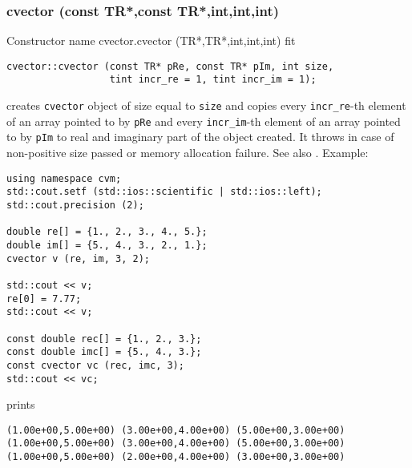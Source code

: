 \subsubsection{cvector (const TR*,const TR*,int,int,int)}
Constructor%
\pdfdest name {cvector.cvector (TR*,TR*,int,int,int)} fit
\begin{verbatim}
cvector::cvector (const TR* pRe, const TR* pIm, int size,
                  tint incr_re = 1, tint incr_im = 1);
\end{verbatim}
creates  \verb"cvector" object
of size equal to \verb"size" and copies
every \verb"incr_re"-th element of an array  pointed to by \verb"pRe"
and 
every \verb"incr_im"-th element of an array  pointed to by \verb"pIm"
to real and imaginary part of the object created.
It throws  
in case of non-positive size passed or memory allocation failure.
See also .
Example:
\begin{Verbatim}
using namespace cvm;
std::cout.setf (std::ios::scientific | std::ios::left);
std::cout.precision (2);

double re[] = {1., 2., 3., 4., 5.};
double im[] = {5., 4., 3., 2., 1.};
cvector v (re, im, 3, 2);

std::cout << v;
re[0] = 7.77;
std::cout << v;

const double rec[] = {1., 2., 3.};
const double imc[] = {5., 4., 3.};
const cvector vc (rec, imc, 3);
std::cout << vc;
\end{Verbatim}
prints
\begin{Verbatim}
(1.00e+00,5.00e+00) (3.00e+00,4.00e+00) (5.00e+00,3.00e+00)
(1.00e+00,5.00e+00) (3.00e+00,4.00e+00) (5.00e+00,3.00e+00)
(1.00e+00,5.00e+00) (2.00e+00,4.00e+00) (3.00e+00,3.00e+00)
\end{Verbatim}
\newpage



